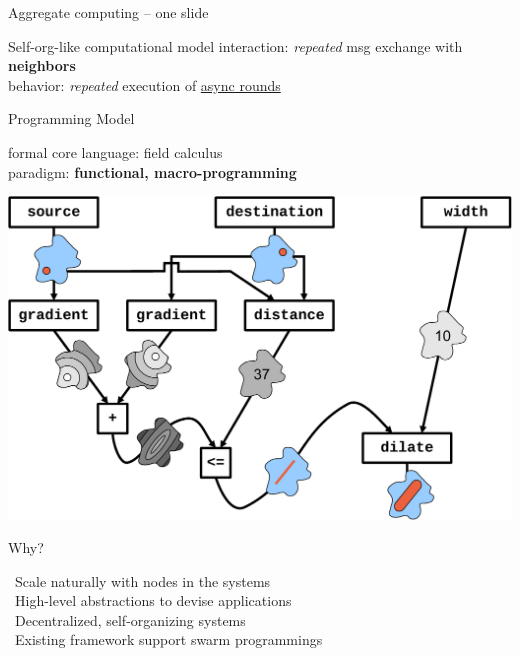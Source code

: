 \documentclass[aspectratio=169]{beamer}
\newcommand{\hsplit}[2]{
\begin{minipage}{0.48\textwidth}
#1
\end{minipage}
\hfill
\begin{minipage}{0.48\textwidth}
#2
\end{minipage}
}
\newcommand{\lbl}[1]{\textbf{\textcolor{gray!90!white}{#1}}}
\newcommand{\bo}[1]{\textbf{#1}}
\begin{document}
\begin{frame}[fragile]{Aggregate computing -- one slide}
	
	\hsplit{

  \begin{exampleblock}{\footnotesize Self-org-like computational model}
		\scriptsize
		\alert{interaction:} \emph{repeated} msg exchange with \bo{neighbors}
		\\[-0.05cm]%
		\alert{behavior:} \emph{repeated} execution of \underline{async rounds}%
		\\[-0.05cm]%
	\end{exampleblock}
	\begin{exampleblock}{\footnotesize Programming Model}
	\scriptsize

	\alert{formal core language:} field calculus
	\\[-0.05cm]
	\alert{paradigm:} \bo{functional, macro-programming}

	\centering
	\includegraphics[height=0.33\textheight]{img/channel.pdf}
	\end{exampleblock}	
		}{
		\begin{exampleblock}{\footnotesize Why?}
			\scriptsize
		
			\alert{\faThumbsUp} \, Scale naturally with nodes in the systems\\[-0.05cm]
			\alert{\faThumbsUp} \, High-level abstractions to devise applications
			\\[-0.05cm]
			\alert{\faThumbsUp} \, Decentralized, self-organizing systems
			\\[-0.05cm]
			\alert{\faThumbsUp} \, Existing framework support swarm programmings
		\end{exampleblock}
		
}
\end{frame}
\end{document}
